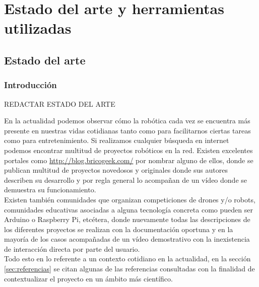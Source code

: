 

\chapter[Estado del arte y herramientas utilizadas]{Estado del arte y herramientas utilizadas}
\label{chap:herramientas}


\section{ Estado del arte }

\subsection{Introducción}

REDACTAR ESTADO DEL ARTE

En la actualidad podemos observar cómo la robótica cada vez se encuentra más presente en nuestras vidas cotidianas tanto como para facilitarnos ciertas tareas como para entretenimiento. Si realizamos 
cualquier búsqueda en internet podemos encontrar multitud de proyectos robóticos en la red. Existen excelentes portales como \url{http://blog.bricogeek.com/} por nombrar alguno de ellos, donde se
publican multitud de proyectos novedosos y originales donde sus autores describen su desarrollo y por regla general lo acompañan de un vídeo donde se demuestra su funcionamiento.\\

Existen también comunidades que organizan competiciones de drones y/o robots, comunidades educativas asociadas a alguna tecnología concreta como pueden ser Arduino o Raspberry Pi, etcétera, donde nuevamente todas las 
descripciones de los diferentes proyectos se realizan con la documentación oportuna y en la mayoría de los casos acompañadas de un vídeo demostrativo con la inexistencia de interacción directa por parte 
del usuario.\\

Todo esto en lo referente a un contexto cotidiano en la actualidad, en la sección \ref{sec:referencias} se citan algunas de las referencias consultadas con la finalidad de contextualizar el proyecto 
en un ámbito más científico.\\

